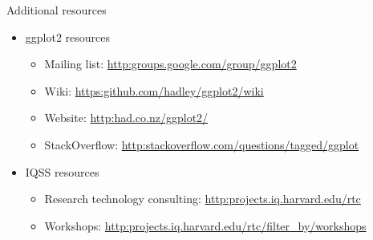 \documentclass[table,smaller]{beamer}
\begin{document}
\begin{frame}[label=sec-9-2]{Additional resources}
\begin{itemize}
\item ggplot2 resources
\begin{itemize}
\item Mailing list: \url{http:groups.google.com/group/ggplot2}
\item Wiki: \url{https:github.com/hadley/ggplot2/wiki}
\item Website: \url{http:had.co.nz/ggplot2/}
\item StackOverflow: \url{http:stackoverflow.com/questions/tagged/ggplot}
\end{itemize}
\item IQSS resources
\begin{itemize}
\item Research technology consulting: \url{http:projects.iq.harvard.edu/rtc}
\item Workshops: \url{http:projects.iq.harvard.edu/rtc/filter_by/workshops}
\end{itemize}
\end{itemize}
\end{frame}
\end{document}
